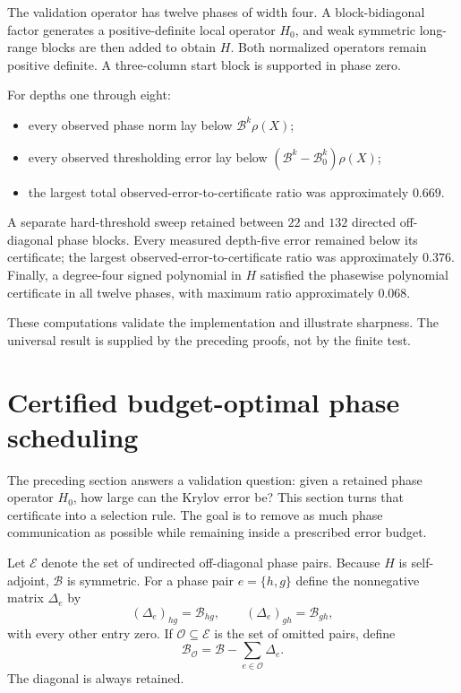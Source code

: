 \documentclass[11pt]{article}
\theoremstyle{definition}
\theoremstyle{remark}
\begin{document}
The validation operator has twelve phases of width four.  A block-bidiagonal
factor generates a positive-definite local operator $H_0$, and weak symmetric
long-range blocks are then added to obtain $H$.  Both normalized operators
remain positive definite.  A three-column start block is supported in phase
zero.

For depths one through eight:
\begin{itemize}
\item every observed phase norm lay below $\mathcal B^k\rho(X)$;
\item every observed thresholding error lay below
$(\mathcal B^k-\mathcal B_0^k)\rho(X)$;
\item the largest total observed-error-to-certificate ratio was approximately
$0.669$.
\end{itemize}

A separate hard-threshold sweep retained between $22$ and $132$ directed
off-diagonal phase blocks.  Every measured depth-five error remained below its
certificate; the largest observed-error-to-certificate ratio was approximately
$0.376$.  Finally, a degree-four signed polynomial in $H$ satisfied the
phasewise polynomial certificate in all twelve phases, with maximum ratio
approximately $0.068$.

These computations validate the implementation and illustrate sharpness.  The
universal result is supplied by the preceding proofs, not by the finite test.


\section{Certified budget-optimal phase scheduling}
\label{sec:budget-scheduler}

The preceding section answers a validation question: given a retained phase
operator $H_0$, how large can the Krylov error be?  This section turns that
certificate into a selection rule.  The goal is to remove as much phase
communication as possible while remaining inside a prescribed error budget.

Let $\mathcal E$ denote the set of undirected off-diagonal phase pairs.  Because
$H$ is self-adjoint, $\mathcal B$ is symmetric.  For a phase pair
$e=\{h,g\}$ define the nonnegative matrix $\Delta_e$ by
\[
(\Delta_e)_{hg}=\mathcal B_{hg},\qquad
(\Delta_e)_{gh}=\mathcal B_{gh},
\]
with every other entry zero.  If $\mathcal O\subseteq\mathcal E$ is the set
of omitted pairs, define
\[
\mathcal B_{\mathcal O}
=\mathcal B-\sum_{e\in\mathcal O}\Delta_e.
\]
The diagonal is always retained.
\end{document}
